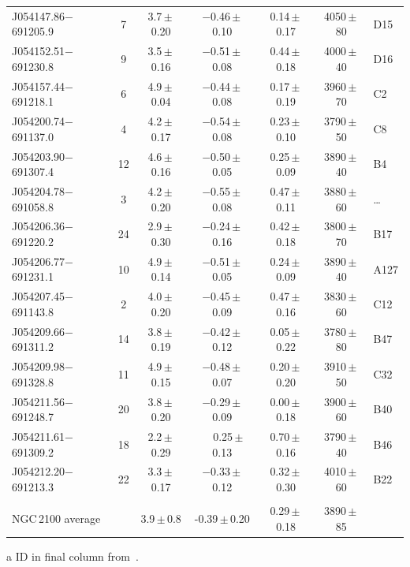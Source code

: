 \documentclass[useAMS,usenatbib]{mn2e}
\def\pp{$\phantom{-}$}
\begin{document}
\begin{table}
\begin{center}
\begin{threeparttable}
\begin{tabular}{lc ccccl}
J054147.86$-$691205.9 & 7  & 3.7\,$\pm$\,0.20 & $-$0.46\,$\pm$\,0.10 & 0.14\,$\pm$\,0.17 & 4050\,$\pm$\,80 & D15\\
J054152.51$-$691230.8 & 9  & 3.5\,$\pm$\,0.16 & $-$0.51\,$\pm$\,0.08 & 0.44\,$\pm$\,0.18 & 4000\,$\pm$\,40 & D16\\
J054157.44$-$691218.1 & 6  & 4.9\,$\pm$\,0.04 & $-$0.44\,$\pm$\,0.08 & 0.17\,$\pm$\,0.19 & 3960\,$\pm$\,70 & C2\\ %
J054200.74$-$691137.0 & 4  & 4.2\,$\pm$\,0.17 & $-$0.54\,$\pm$\,0.08 & 0.23\,$\pm$\,0.10 & 3790\,$\pm$\,50 & C8\\
J054203.90$-$691307.4 & 12 & 4.6\,$\pm$\,0.16 & $-$0.50\,$\pm$\,0.05 & 0.25\,$\pm$\,0.09 & 3890\,$\pm$\,40 & B4\\
J054204.78$-$691058.8 & 3  & 4.2\,$\pm$\,0.20 & $-$0.55\,$\pm$\,0.08 & 0.47\,$\pm$\,0.11 & 3880\,$\pm$\,60 & \ldots\\
J054206.36$-$691220.2 & 24 & 2.9\,$\pm$\,0.30 & $-$0.24\,$\pm$\,0.16 & 0.42\,$\pm$\,0.18 & 3800\,$\pm$\,70 & B17\\
J054206.77$-$691231.1 & 10 & 4.9\,$\pm$\,0.14 & $-$0.51\,$\pm$\,0.05 & 0.24\,$\pm$\,0.09 & 3890\,$\pm$\,40 & A127\\
J054207.45$-$691143.8 & 2  & 4.0\,$\pm$\,0.20 & $-$0.45\,$\pm$\,0.09 & 0.47\,$\pm$\,0.16 & 3830\,$\pm$\,60 & C12\\
J054209.66$-$691311.2 & 14 & 3.8\,$\pm$\,0.19 & $-$0.42\,$\pm$\,0.12 & 0.05\,$\pm$\,0.22 & 3780\,$\pm$\,80 & B47\\
J054209.98$-$691328.8 & 11 & 4.9\,$\pm$\,0.15 & $-$0.48\,$\pm$\,0.07 & 0.20\,$\pm$\,0.20 & 3910\,$\pm$\,50 & C32\\
J054211.56$-$691248.7 & 20 & 3.8\,$\pm$\,0.20 & $-$0.29\,$\pm$\,0.09 & 0.00\,$\pm$\,0.18 & 3900\,$\pm$\,60 & B40\\
J054211.61$-$691309.2 & 18 & 2.2\,$\pm$\,0.29 & \pp0.25\,$\pm$\,0.13 & 0.70\,$\pm$\,0.16 & 3790\,$\pm$\,40 & B46\\
J054212.20$-$691213.3 & 22 & 3.3\,$\pm$\,0.17 & $-$0.33\,$\pm$\,0.12 & 0.32\,$\pm$\,0.30 & 4010\,$\pm$\,60 & B22\\
\\
NGC\,2100 average & & 3.9\,$\pm$\,0.8 & -0.39\,$\pm$\,0.20 &  0.29\,$\pm$\,0.18 & 3890\,$\pm$\,85 &\\
  \hline
  \end{tabular}
\begin{tablenotes}
    \item [a] ID in final column from{~\cite{1974A&AS...15..261R}}.
\end{tablenotes}
  \end{threeparttable}
  \end{center}
\end{table}
\end{document}

